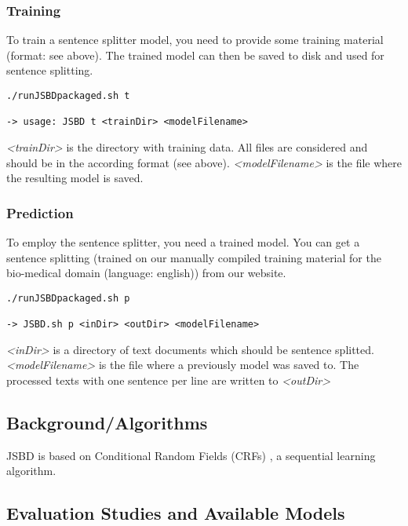 \documentclass[11pt,a4paper,halfparskip]{scrartcl}
\begin{document}
\subsubsection{Training}

To train a sentence splitter model, you need to provide some training
material (format: see above). The trained model can then be saved to
disk and used for sentence splitting.

\begin{verbatim}
./runJSBDpackaged.sh t

-> usage: JSBD t <trainDir> <modelFilename>
\end{verbatim}

\textit{<trainDir>} is the directory with training data. All files are
considered and should be in the according format (see above).
\textit{<modelFilename>} is the file where the resulting model is
saved.

\subsubsection{Prediction}

To employ the sentence splitter, you need a trained model. You can get
a sentence splitting (trained on our manually compiled training
material for the bio-medical domain (language: english)) from our
website.


\begin{verbatim}
./runJSBDpackaged.sh p

-> JSBD.sh p <inDir> <outDir> <modelFilename>
\end{verbatim}

\textit{<inDir>} is a directory of text documents which should be
sentence splitted. \textit{<modelFilename>} is the file where a
previously model was saved to. The processed texts with one sentence
per line are written to \textit{<outDir>}

\subsection{Background/Algorithms}
\label{sec:background}

JSBD is based on Conditional Random Fields (CRFs) \cite{lafferty01}, a
sequential learning algorithm. 

\subsection{Evaluation Studies and Available Models}
\end{document}
